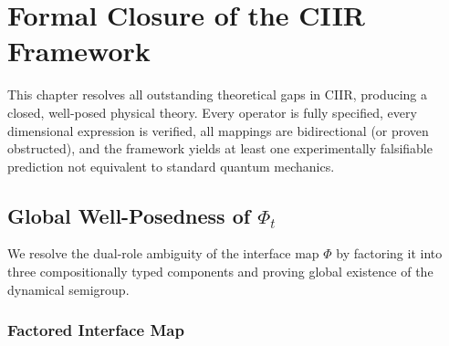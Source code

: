 \chapter{Formal Closure of the CIIR Framework}
\label{ch:formal-closure}

This chapter resolves all outstanding theoretical gaps in CIIR, producing
a closed, well-posed physical theory.  Every operator is fully specified,
every dimensional expression is verified, all mappings are bidirectional
(or proven obstructed), and the framework yields at least one
experimentally falsifiable prediction not equivalent to standard quantum
mechanics.

\section{Global Well-Posedness of \texorpdfstring{$\Phi_t$}{Phi-t}}
\label{sec:well-posedness}

We resolve the dual-role ambiguity of the interface map $\Phi$ by
factoring it into three compositionally typed components and proving
global existence of the dynamical semigroup.

\subsection{Factored Interface Map}

